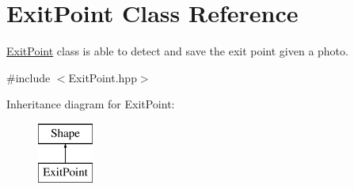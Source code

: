 \hypertarget{class_exit_point}{}\section{Exit\+Point Class Reference}
\label{class_exit_point}


\mbox{\hyperlink{class_exit_point}{Exit\+Point}} class is able to detect and save the exit point given a photo.  




{\ttfamily \#include $<$Exit\+Point.\+hpp$>$}

Inheritance diagram for Exit\+Point\+:\begin{figure}[H]
\begin{center}
\leavevmode
\includegraphics[height=2.000000cm]{class_exit_point}
\end{center}
\end{figure}
